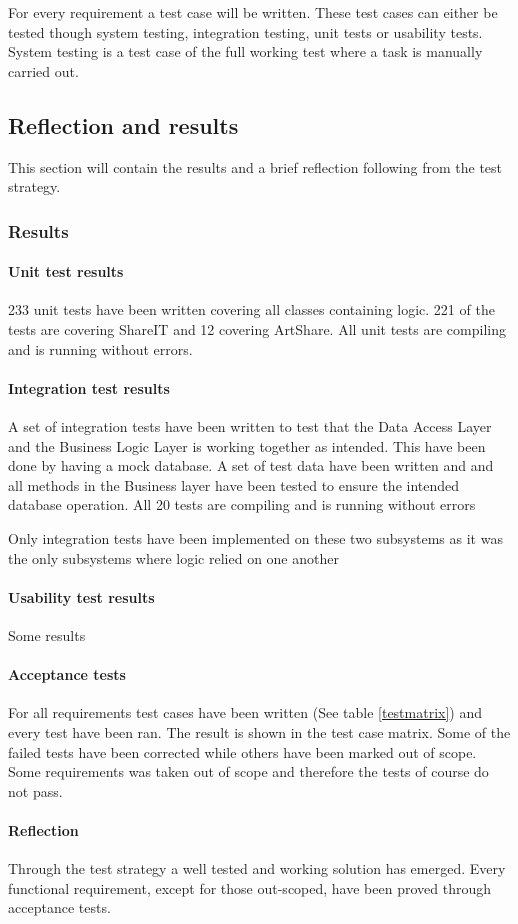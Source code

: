 \documentclass[../report.tex]{subfiles}
\begin{document}
For every requirement a test case will be written. These test cases can either be tested though system testing, integration testing, unit tests or usability tests. System testing is a test case of the full working test where a task is manually carried out. 

\subsection{Reflection and results}
This section will contain the results and a brief reflection following from the test strategy.

\subsubsection{Results}
\paragraph{Unit test results}

233 unit tests have been written covering all classes containing logic. 221 of the tests are covering ShareIT and 12 covering ArtShare. All unit tests are compiling and is running without errors.

\paragraph{Integration test results}

A set of integration tests have been written to test that the Data Access Layer and the Business Logic Layer is working together as intended. This have been done by having a mock database. A set of test data have been written and and all methods in the Business layer have been tested to ensure the intended database operation. All 20 tests are compiling and is running without errors

Only integration tests have been implemented on these two subsystems as it was the only subsystems where logic relied on one another

\paragraph{Usability test results}
Some results

\paragraph{Acceptance tests}
For all requirements test cases have been written (See table \ref{testmatrix}) and every test have been ran. The result is shown in the test case matrix. Some of the failed tests have been corrected while others have been marked out of scope. Some requirements was taken out of scope and therefore the tests of course do not pass.

\paragraph{Reflection}

Through the test strategy a well tested and working solution has emerged. Every functional requirement, except for those out-scoped, have been proved through acceptance tests.
\end{document}
